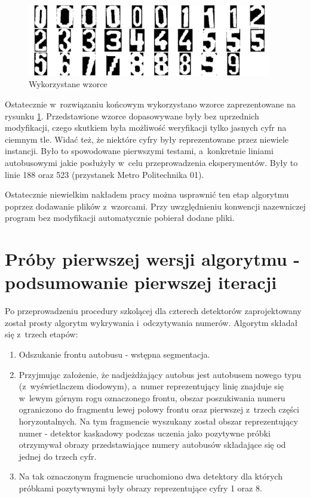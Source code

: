 \begin{figure}[h!]
    \centering
    \includegraphics[width=0.95\textwidth]{img/exp_templates_used}
    \caption{Wykorzystane wzorce}
    \label{fig:used_templates}
\end{figure}

Ostatecznie w~rozwiązaniu końcowym wykorzystano wzorce zaprezentowane
na rysunku \ref{fig:used_templates}.
Przedstawione wzorce dopasowywane były bez uprzednich modyfikacji,
czego skutkiem była możliwość weryfikacji tylko jasnych cyfr
na ciemnym tle. Widać też, że niektóre cyfry były reprezentowane
przez niewiele instancji. Było to spowodowane pierwszymi testami,
a~konkretnie liniami autobusowymi jakie posłużyły w~celu
przeprowadzenia eksperymentów. Były to linie 188 oraz 523 (przystanek
Metro Politechnika 01). 

Ostatecznie niewielkim nakładem pracy można usprawnić ten etap
algorytmu poprzez dodawanie plików z~wzorcami. Przy uwzględnieniu 
konwencji nazewniczej program bez modyfikacji automatycznie
pobierał dodane pliki.

\section{Próby pierwszej wersji algorytmu - podsumowanie pierwszej iteracji}

Po przeprowadzeniu procedury szkolącej dla czterech detektorów
zaprojektowany został prosty algorytm wykrywania i~odczytywania numerów.
Algorytm składał się z~trzech etapów:

\begin{enumerate}
    \item Odszukanie frontu autobusu - wstępna segmentacja.
    \item Przyjmując założenie, że nadjeżdżający autobus jest autobusem
        nowego typu (z~wyświetlaczem diodowym), a~numer reprezentujący
        linię znajduje się w~lewym górnym rogu oznaczonego frontu,
        obszar poszukiwania numeru ograniczono do fragmentu lewej połowy
        frontu oraz pierwszej z~trzech części horyzontalnych. Na tym 
        fragmencie wyszukany został obszar reprezentujący numer -
        detektor kaskadowy podczas uczenia jako pozytywne próbki
        otrzymywał obrazy przedstawiające numery autobusów składające
        się od jednej do trzech cyfr.
    \item Na tak oznaczonym fragmencie uruchomiono dwa detektory
        dla których próbkami pozytywnymi były obrazy reprezentujące
        cyfry 1 oraz 8.
\end{enumerate}

